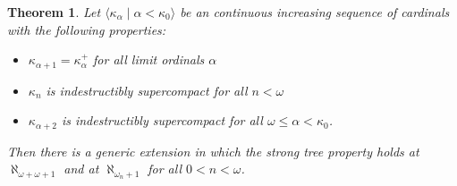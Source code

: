 \documentclass[psamsfonts]{amsart}
\newtheorem{theorem}[thm]{Theorem}
\theoremstyle{definition}
\newcommand{\ka}{\kappa}
\newcommand{\w}{\omega}
\numberwithin{equation}{section}
\begin{document}
\begin{theorem}
	Let $\langle \ka_\alpha \mid \alpha < \ka_0\rangle$ be an continuous increasing sequence of cardinals with the following properties:
	\begin{itemize}
		\item $\ka_{\alpha+1} = \ka_\alpha^+$ for all limit ordinals $\alpha$
		\item $\ka_n$ is indestructibly supercompact for all $n<\w$
		\item $\ka_{\alpha+2}$ is indestructibly supercompact for all $\w\leq \alpha < \ka_0$.
	\end{itemize}
	
	Then there is a generic extension in which the strong tree property holds at $\aleph_{\w+\w+1}$ and at $\aleph_{\w_n+1}$ for all $0<n<\w$.
\end{theorem}
\end{document}

